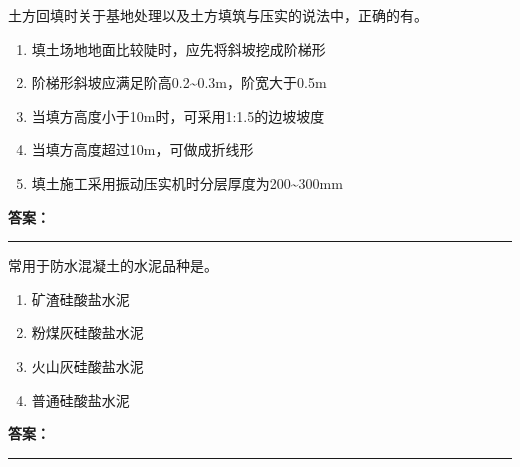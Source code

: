 \documentclass[UTF8,fontset=fandol,11pt]{ctexart}
\newcommand{\answerline}{\textcolor{answerred}{\rule{2.4cm}{0.7pt}}}
\begin{document}
\begin{quizbox}[title={乱序第 75 题｜第一章土方工程}]

土方回填时关于基地处理以及土方填筑与压实的说法中，正确的有。\\

\begin{enumerate}[label=\Alph*.]

\item 填土场地地面比较陡时，应先将斜坡挖成阶梯形

\item 阶梯形斜坡应满足阶高0.2\textasciitilde{}0.3m，阶宽大于0.5m

\item 当填方高度小于10m时，可采用1:1.5的边坡坡度

\item 当填方高度超过10m，可做成折线形

\item 填土施工采用振动压实机时分层厚度为200\textasciitilde{}300mm

\end{enumerate}

\textbf{\textcolor{answerred}{答案：}} \answerline

\end{quizbox}

\vspace{0.2em}

\begin{quizbox}[title={乱序第 76 题｜第四章混凝土结构工程}]

常用于防水混凝土的水泥品种是。\\

\begin{enumerate}[label=\Alph*.]

\item 矿渣硅酸盐水泥

\item 粉煤灰硅酸盐水泥

\item 火山灰硅酸盐水泥

\item 普通硅酸盐水泥

\end{enumerate}

\textbf{\textcolor{answerred}{答案：}} \answerline

\end{quizbox}

\vspace{0.2em}
\end{document}
